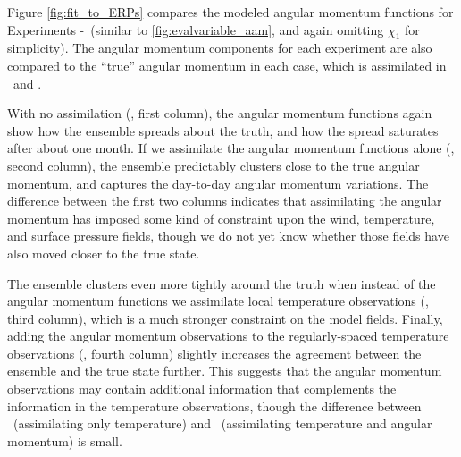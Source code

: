 Figure \ref{fig:fit_to_ERPs} compares the modeled angular momentum functions for Experiments \NODA-\ERPRST~(similar to \ref{fig:evalvariable_aam}, and again omitting $\chi_1$ for simplicity). 
The angular momentum components for each experiment are also compared to the ``true'' angular momentum in each case, which is assimilated in \ERPALL ~and \ERPRST.  

With no assimilation (\NODA, first column), the angular momentum functions again show how the ensemble spreads about the truth, and how the spread saturates after about one month.
If we assimilate the angular momentum functions alone (\ERPALL, second column), the ensemble predictably clusters close to the true angular momentum, and captures the day-to-day angular momentum variations. 
The difference between the first two columns indicates that assimilating the angular momentum has imposed some kind of constraint upon the wind, temperature, and surface pressure fields, though we do not yet know whether those fields have also moved closer to the true state. 

The ensemble clusters even more tightly around the truth when instead of the angular momentum functions we assimilate local temperature observations (\RST, third column), which is a much stronger constraint on the model fields. 
Finally, adding the angular momentum observations to the regularly-spaced temperature observations (\ERPRST, fourth column) slightly increases the agreement between the ensemble and the true state further.  
This suggests that the angular momentum observations may contain additional information that complements the information in the temperature observations, though the difference between \RST ~(assimilating only temperature) and \ERPRST ~(assimilating temperature and angular momentum) is small.  
